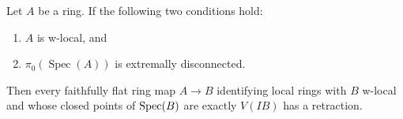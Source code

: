 \begin{lemma}
  \label{thm:ff-identifies-local-rings-plus-c-has-retraction-if}
  Let $A$ be a ring. If the following two conditions hold:
  \begin{enumerate}
    \item $A$ is w-local, and
    \item $\pi_0(\operatorname{Spec}(A))$ is extremally disconnected.
  \end{enumerate}
  Then every faithfully flat ring map $A \to B$ identifying local rings with \(B\) w-local and whose closed points of \(\operatorname{Spec} (B)\) are exactly \(V(IB)\) has a retraction.
\end{lemma}

